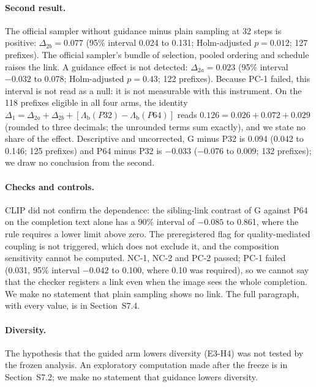 \documentclass[acmsmall,screen]{acmart}
\begin{document}
\paragraph{Second result.}
The official sampler without guidance minus plain sampling at 32 steps is positive: $\Delta_{2b}=0.077$ (95\% interval 0.024 to 0.131; Holm-adjusted $p=0.012$; 127 prefixes). The official sampler's bundle of selection, pooled ordering and schedule raises the link. A guidance effect is not detected: $\Delta_{2a}=0.023$ (95\% interval $-0.032$ to 0.078; Holm-adjusted $p=0.43$; 122 prefixes). Because PC-1 failed, this interval is not read as a null: it is not measurable with this instrument. On the 118 prefixes eligible in all four arms, the identity $\Delta_1=\Delta_{2a}+\Delta_{2b}+[\Lambda_{\mathrm b}(P32)-\Lambda_{\mathrm b}(P64)]$ reads $0.126 = 0.026 + 0.072 + 0.029$ (rounded to three decimals; the unrounded terms sum exactly), and we state no share of the effect. Descriptive and uncorrected, G minus P32 is 0.094 (0.042 to 0.146; 125 prefixes) and P64 minus P32 is $-0.033$ ($-0.076$ to 0.009; 132 prefixes); we draw no conclusion from the second. %

\paragraph{Checks and controls.}
CLIP did not confirm the dependence: the sibling-link contrast of G against P64 on the completion text alone has a 90\% interval of $-0.085$ to 0.861, where the rule requires a lower limit above zero. The preregistered flag for quality-mediated coupling is not triggered, which does not exclude it, and the composition sensitivity cannot be computed. NC-1, NC-2 and PC-2 passed; PC-1 failed (0.031, 95\% interval $-0.042$ to 0.100, where 0.10 was required), so we cannot say that the checker registers a link even when the image sees the whole completion. We make no statement that plain sampling shows no link. The full paragraph, with every value, is in Section~S7.4. %

\paragraph{Diversity.}
The hypothesis that the guided arm lowers diversity (E3-H4) was not tested by the frozen analysis. An exploratory computation made after the freeze is in Section~S7.2; we make no statement that guidance lowers diversity.
\end{document}
